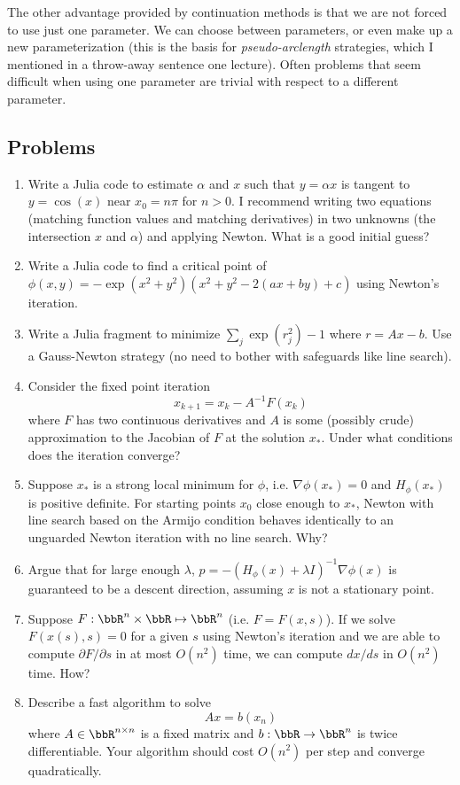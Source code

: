 \documentclass[12pt, leqno]{article}
\begin{document}
The other advantage provided by continuation methods is that we are
not forced to use just one parameter.  We can choose between
parameters, or even make up a new parameterization (this is the basis
for {\em pseudo-arclength} strategies, which I mentioned in a
throw-away sentence one lecture).  Often problems that seem difficult
when using one parameter are trivial with respect to a different
parameter.

\subsection{Problems}

\begin{enumerate}
\item
  Write a Julia code to estimate $\alpha$ and $x$ such that
  $y = \alpha x$ is tangent to $y = \cos(x)$ near $x_0 = n \pi$
  for $n > 0$.  I recommend writing two equations (matching function
  values and matching derivatives) in two unknowns (the intersection
  $x$ and $\alpha$) and applying Newton.  What is a good initial guess?
\item
  Write a Julia code to find a critical point of
  $\phi(x,y) = -\exp(x^2+y^2) (x^2 + y^2 - 2(ax + by) + c)$
  using Newton's iteration.
\item
  Write a Julia fragment to minimize $\sum_j \exp(r_j^2)-1$ where
  $r = Ax-b$.  Use a Gauss-Newton strategy (no need to bother
  with safeguards like line search).
\item
  Consider the fixed point iteration
  \[
    x_{k+1} = x_k - A^{-1} F(x_k)
  \]
  where $F$ has two continuous derivatives and $A$ is some (possibly
  crude) approximation to the Jacobian of $F$ at the solution $x_*$.
  Under what conditions does the iteration converge?
\item
  Suppose $x_*$ is a strong local minimum for $\phi$, i.e. $\nabla
  \phi(x_*) = 0$ and $H_\phi(x_*)$ is positive definite.  For starting
  points $x_0$ close enough to $x_*$, Newton with line search based
  on the Armijo condition behaves identically to an unguarded
  Newton iteration with no line search.  Why?
\item
  Argue that for large enough $\lambda$,
  $p = -(H_{\phi}(x) + \lambda I)^{-1} \nabla \phi(x)$ is guaranteed
  to be a descent direction, assuming $x$ is not a stationary point.
\item
  Suppose $F : \bbR^n \times \bbR \mapsto \bbR^n$ (i.e. $F = F(x,s)$).
  If we solve $F(x(s), s) = 0$ for a given $s$ using Newton's
  iteration and we are able to compute $\partial F/\partial s$
  in at most $O(n^2)$ time, we can compute $dx/ds$ in $O(n^2)$ time.
  How?
\item
  Describe a fast algorithm to solve
  \[
    Ax = b(x_n)
  \]
  where $A \in \bbR^{n \times n}$ is a fixed matrix and
  $b : \bbR \rightarrow \bbR^n$ is twice differentiable.
  Your algorithm should cost $O(n^2)$ per step and converge quadratically.
\end{enumerate}
\end{document}
